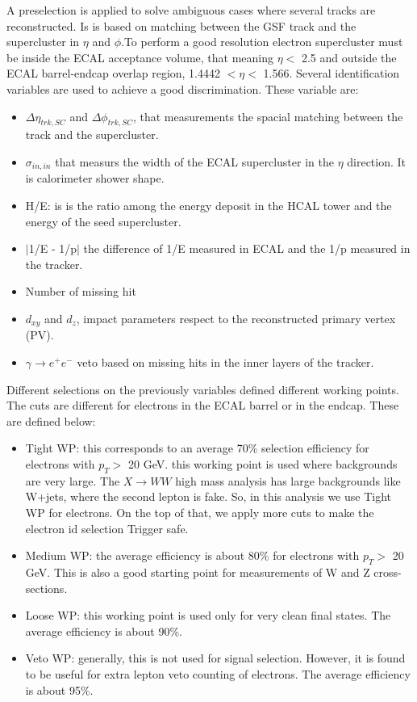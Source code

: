 A preselection is applied to solve ambiguous cases where several tracks are reconstructed. Is is based on matching
between the GSF track and the supercluster in $\eta$ and $\phi$.To perform a good resolution electron supercluster must
be inside the ECAL acceptance volume, that meaning  $\eta<$ 2.5 and outside the ECAL barrel-endcap
overlap region, 1.4442 $<\eta<$ 1.566.
Several identification variables are used to achieve a good discrimination. These variable are:
\begin{itemize}
\item $\Delta \eta_{trk,SC}$ and $\Delta \phi_{trk,SC}$, that measurements the spacial matching between the track
and the supercluster.
\item $\sigma_{in,in}$ that measurs the width of the ECAL supercluster in the $\eta$ direction. It is calorimeter shower shape.
\item H/E: is is the ratio among the energy deposit in the HCAL tower and the energy of the seed supercluster.
\item $|$1/E - 1/p$|$ the difference of 1/E measured in ECAL and the 1/p measured in the tracker.
\item Number of missing hit
\item $d_{xy}$ and $d_z$, impact parameters respect to the reconstructed primary vertex (PV).
\item $\gamma \to e^+ e^-$ veto based on missing hits in the inner layers of the tracker.
\end{itemize}
Different selections on the previously variables defined different working points. The cuts are different for electrons in
the ECAL barrel or in the endcap. These are defined below:
\begin{itemize}
\item Tight WP: this corresponds to an average 70\% selection efficiency for electrons with
$p_T >$ 20 GeV. this working point is used where backgrounds are very large. The
$X \to WW$ high mass analysis has large backgrounds like W+jets, where the second lepton is fake. 
So, in this analysis we use Tight WP for electrons. On the top of that, we apply more cuts to make the electron id selection Trigger safe.
\item Medium WP: the average efficiency is about 80\% for electrons with $p_T>$ 20
GeV. This is also a good starting point for measurements of W and Z cross-sections.
\item Loose WP: this working point is used only for very clean final states. The average efficiency is about 90\%.
\item Veto WP: generally, this is not used for signal selection. However, it is found to
be useful for extra lepton veto counting of electrons. The average efficiency is about 95\%.
\end{itemize}
